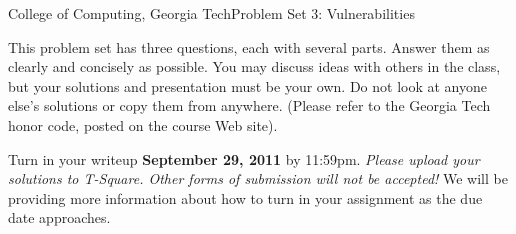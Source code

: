 \documentclass[11pt]{article}
\begin{document}


{College of Computing, Georgia Tech}{Problem Set 3: Vulnerabilities}

This problem set has three questions, each with several parts.  Answer
them as clearly and concisely as possible.  You may discuss ideas with
others in the class, but your solutions and presentation must be your
own.  Do not look at anyone else's solutions or copy them from
anywhere. (Please refer to the Georgia Tech honor code, posted on the
course Web site).

Turn in your writeup {\bf September 29, 2011} by 11:59pm.
{\em Please upload your solutions to T-Square.  Other forms of
  submission will not be accepted!}  We will be providing more
information about how to turn in your assignment as the due date
approaches.
\end{document}
